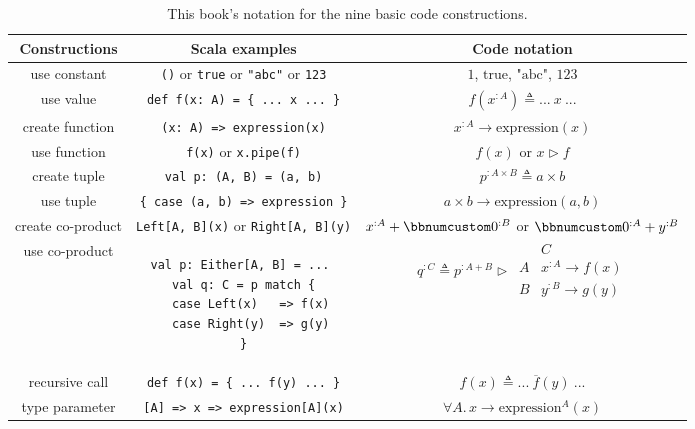 \begin{table}
\begin{centering}
\begin{tabular}{|c|c|c|}
\hline 
\textbf{\small{}Constructions} & \textbf{\small{}Scala examples} & \textbf{\small{}Code notation}\tabularnewline
\hline 
\hline 
{\small{}use constant} & {\small{}}\lstinline!()!{\small{} or }\lstinline!true!{\small{}
or }\lstinline!"abc"!{\small{} or }\lstinline!123! & {\small{}$1$, $\text{true}$, $\text{"abc"}$, $123$}\tabularnewline
\hline 
{\small{}use value} & {\small{}}\lstinline!def f(x: A) = { ... x ... }! & {\small{}$f(x^{:A})\triangleq...~x~...$}\tabularnewline
\hline 
{\small{}create function} & {\small{}}\lstinline!(x: A) => expression(x)! & {\small{}$x^{:A}\rightarrow\text{expression}\left(x\right)$}\tabularnewline
\hline 
{\small{}use function} & {\small{}}\lstinline!f(x)!{\small{} or }\lstinline!x.pipe(f)! & {\small{}$f(x)$ or $x\triangleright f$}\tabularnewline
\hline 
{\small{}create tuple} & {\small{}}\lstinline!val p: (A, B) = (a, b)! & {\small{}$p^{:A\times B}\triangleq a\times b$}\tabularnewline
\hline 
{\small{}use tuple} & {\small{}}\lstinline!{ case (a, b) => expression }! & {\small{}$a\times b\rightarrow\text{expression}\left(a,b\right)$}\tabularnewline
\hline 
{\small{}create co-product} & {\small{}}\lstinline!Left[A, B](x)!{\small{} or }\lstinline!Right[A, B](y)! & {\small{}$x^{:A}+\bbnum 0^{:B}$ or $\bbnum 0^{:A}+y^{:B}$}\tabularnewline
\hline 
{\small{}use co-product} & {\small{}\hspace*{-0.013\linewidth}}%
\begin{minipage}[c][1\totalheight][b]{0.33\columnwidth}%
{\small{}\vspace{0.28\baselineskip}
}
\begin{lstlisting}
val p: Either[A, B] = ... 
val q: C = p match {
  case Left(x)   => f(x)
  case Right(y)  => g(y)
}
\end{lstlisting}
{\small{}\vspace{-0.1\baselineskip}
}%
\end{minipage}{\small{} \hspace*{-0.009\linewidth}} & {\small{}$q^{:C}\triangleq p^{:A+B}\triangleright\,\begin{array}{|c||c|}
 & C\\
\hline A & x^{:A}\rightarrow f(x)\\
B & y^{:B}\rightarrow g(y)
\end{array}$}\tabularnewline
\hline 
{\small{}recursive call} & {\small{}}\lstinline!def f(x) = { ... f(y) ... }! & {\small{}$f(x)\triangleq...~\overline{f}(y)~...$}\tabularnewline
\hline 
{\small{}type parameter} & {\small{}}\lstinline![A] => x => expression[A](x)! & {\small{}$\forall A.\,x\rightarrow\text{expression}^{A}(x)$}\tabularnewline
\hline 
\end{tabular}
\par\end{centering}
\caption{This book\textsf{'}s notation for the nine basic code constructions.\label{tab:Mathematical-notation-for-basic-code-constructions}}
\end{table}


